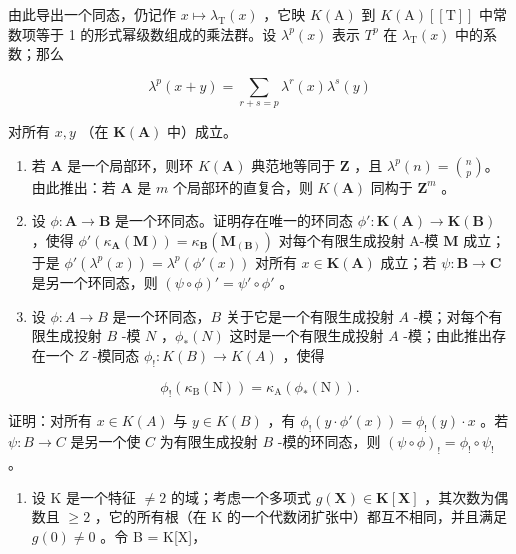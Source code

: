由此导出一个同态，仍记作 \(x \mapsto \lambda_{\mathrm{T}}(x)\) ，它映 \(K(\mathrm{A})\) 到 \(K(\mathrm{A})[[\mathrm{T}]]\) 中常数项等于 1 的形式幂级数组成的乘法群。设 \(\lambda^{p}(x)\) 表示 \(T^{p}\) 在 \(\lambda_{\mathrm{T}}(x)\) 中的系数；那么

\[
\lambda^ {p} (x + y) = \sum_ {r + s = p} \lambda^ {r} (x) \lambda^ {s} (y)
\]

对所有 \(x, y\) （在 \(\mathbf{K}(\mathbf{A})\) 中）成立。

\begin{enumerate}
\def\labelenumi{(\alph{enumi})}
\setcounter{enumi}{2}
\item
  若 \(\mathbf{A}\) 是一个局部环，则环 \(K(\mathbf{A})\) 典范地等同于 \(\mathbf{Z}\) ，且 \(\lambda^p(n) = \binom{n}{p}\)。由此推出：若 \(\mathbf{A}\) 是 \(m\) 个局部环的直复合，则 \(K(\mathbf{A})\) 同构于 \(\mathbf{Z}^m\) 。
\item
  设 \(\phi: \mathbf{A} \to \mathbf{B}\) 是一个环同态。证明存在唯一的环同态 \(\phi': \mathbf{K}(\mathbf{A}) \to \mathbf{K}(\mathbf{B})\) ，使得 \(\phi'(\kappa_{\mathbf{A}}(\mathbf{M})) = \kappa_{\mathbf{B}}(\mathbf{M}_{(\mathbf{B})})\) 对每个有限生成投射 A-模 \(\mathbf{M}\) 成立；于是 \(\phi'(\lambda^p(x)) = \lambda^p(\phi'(x))\) 对所有 \(x \in \mathbf{K}(\mathbf{A})\) 成立；若 \(\psi: \mathbf{B} \to \mathbf{C}\) 是另一个环同态，则 \((\psi \circ \phi)' = \psi' \circ \phi'\) 。
\item
  设 \(\phi: A \to B\) 是一个环同态，\(B\) 关于它是一个有限生成投射 \(A\) -模；对每个有限生成投射 \(B\) -模 \(N\) ，\(\phi_{*}(N)\) 这时是一个有限生成投射 \(A\) -模；由此推出存在一个 \(Z\) -模同态 \(\phi_!: K(B) \to K(A)\) ，使得
\end{enumerate}

\[
\phi_! (\kappa_ {\mathrm{B}} (\mathrm{N})) = \kappa_ {\mathrm{A}} (\phi_ {*} (\mathrm{N})).
\]

证明：对所有 \(x \in K(A)\) 与 \(y \in K(B)\) ，有 \(\phi_!(y \cdot \phi'(x)) = \phi_!(y) \cdot x\) 。若 \(\psi: B \to C\) 是另一个使 \(C\) 为有限生成投射 \(B\) -模的环同态，则 \((\psi \circ \phi)_! = \phi_! \circ \psi_!\) 。

\begin{enumerate}
\def\labelenumi{\arabic{enumi}.}
\setcounter{enumi}{10}
\tightlist
\item
  设 K 是一个特征 \(\neq2\) 的域；考虑一个多项式 \(g(\mathbf{X})\in\mathbf{K}[\mathbf{X}]\) ，其次数为偶数且 \(\geqslant2\) ，它的所有根（在 K 的一个代数闭扩张中）都互不相同，并且满足 \(g(0)\neq0\) 。令 B = K{[}X{]}，
\end{enumerate}

